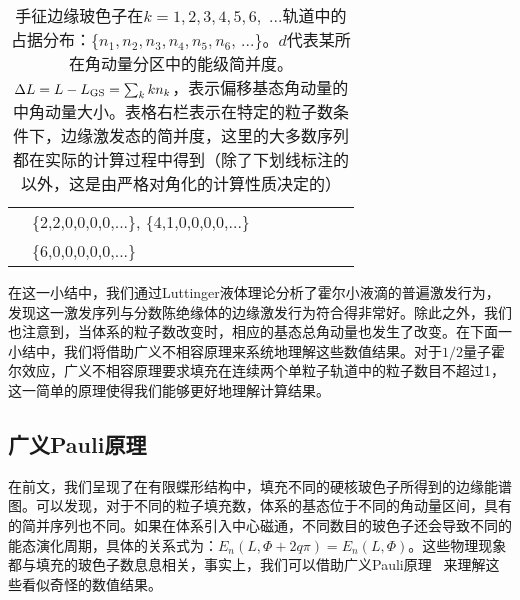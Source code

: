 \begin{table}[h]
\begin{tabular}{c|l|l c c c c c}
       & \{2,2,0,0,0,0,...\},   \{4,1,0,0,0,0,...\}                         \\
       & \{6,0,0,0,0,0,...\}                                                 \\
 \hline
 \hline
\end{tabular}
\caption{手征边缘玻色子在$k=1, 2, 3, 4, 5, 6,$ ...轨道中的占据分布：\{$n_1,n_2,n_3,n_4,n_5,n_6$, ...\}。$d$代表某所在角动量分区中的能级简并度。$\Delta L = L - L_{\rm GS} = \sum_{k} kn_{k}$，表示偏移基态角动量的中角动量大小。表格右栏表示在特定的粒子数条件下，边缘激发态的简并度，这里的大多数序列都在实际的计算过程中得到（除了下划线标注的以外，这是由严格对角化的计算性质决定的）}
\label{tab:luttinger}
\end{table}



在这一小结中，我们通过Luttinger液体理论分析了霍尔小液滴的普遍激发行为，发现这一激发序列与分数陈绝缘体的边缘激发行为符合得非常好。除此之外，我们也注意到，当体系的粒子数改变时，相应的基态总角动量也发生了改变。在下面一小结中，我们将借助广义不相容原理来系统地理解这些数值结果。对于$1/2$量子霍尔效应，广义不相容原理要求填充在连续两个单粒子轨道中的粒子数目不超过1，这一简单的原理使得我们能够更好地理解计算结果。


\subsection{广义Pauli原理}
在前文，我们呈现了在有限蝶形结构中，填充不同的硬核玻色子所得到的边缘能谱图。可以发现，对于不同的粒子填充数，体系的基态位于不同的角动量区间，具有的简并序列也不同。如果在体系引入中心磁通，不同数目的玻色子还会导致不同的能态演化周期，具体的关系式为：$E_n(L,\Phi+2q\pi)=E_n(L,\Phi)$。这些物理现象都与填充的玻色子数息息相关，事实上，我们可以借助广义Pauli原理~\cite{Regnault2011}\cite{Bernevig2008,Bergholtz2006,Seidel2006}
来理解这些看似奇怪的数值结果。


